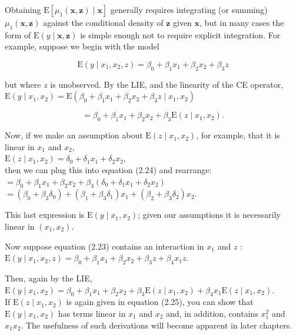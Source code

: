 \documentclass[10pt]{article}
\begin{document}
Obtaining $\mathrm{E}\left[\mu_{1}(\mathbf{x}, \mathbf{z}) \mid \mathbf{x}\right]$ generally requires integrating (or summing) $\mu_{1}(\mathbf{x}, \mathbf{z})$ against the conditional density of $\mathbf{z}$ given $\mathbf{x}$, but in many cases the form of $\mathrm{E}(y \mid \mathbf{x}, \mathbf{z})$ is simple enough not to require explicit integration. For example, suppose we begin with the model


\begin{equation*}
\mathrm{E}\left(y \mid x_{1}, x_{2}, z\right)=\beta_{0}+\beta_{1} x_{1}+\beta_{2} x_{2}+\beta_{3} z \tag{2.23}
\end{equation*}


but where $z$ is unobserved. By the LIE, and the linearity of the CE operator,\\
$\mathrm{E}\left(y \mid x_{1}, x_{2}\right)=\mathrm{E}\left(\beta_{0}+\beta_{1} x_{1}+\beta_{2} x_{2}+\beta_{3} z \mid x_{1}, x_{2}\right)$


\begin{equation*}
=\beta_{0}+\beta_{1} x_{1}+\beta_{2} x_{2}+\beta_{3} \mathrm{E}\left(z \mid x_{1}, x_{2}\right) . \tag{2.24}
\end{equation*}


Now, if we make an assumption about $\mathrm{E}\left(z \mid x_{1}, x_{2}\right)$, for example, that it is linear in $x_{1}$ and $x_{2}$,\\
$\mathrm{E}\left(z \mid x_{1}, x_{2}\right)=\delta_{0}+\delta_{1} x_{1}+\delta_{2} x_{2}$,\\
then we can plug this into equation (2.24) and rearrange:\\
$=\beta_{0}+\beta_{1} x_{1}+\beta_{2} x_{2}+\beta_{3}\left(\delta_{0}+\delta_{1} x_{1}+\delta_{2} x_{2}\right)$\\
$=\left(\beta_{0}+\beta_{3} \delta_{0}\right)+\left(\beta_{1}+\beta_{3} \delta_{1}\right) x_{1}+\left(\beta_{2}+\beta_{3} \delta_{2}\right) x_{2}$.

This last expression is $\mathrm{E}\left(y \mid x_{1}, x_{2}\right)$; given our assumptions it is necessarily linear in $\left(x_{1}, x_{2}\right)$.

Now suppose equation (2.23) contains an interaction in $x_{1}$ and $z$ :\\
$\mathrm{E}\left(y \mid x_{1}, x_{2}, z\right)=\beta_{0}+\beta_{1} x_{1}+\beta_{2} x_{2}+\beta_{3} z+\beta_{4} x_{1} z$.

Then, again by the LIE,\\
$\mathrm{E}\left(y \mid x_{1}, x_{2}\right)=\beta_{0}+\beta_{1} x_{1}+\beta_{2} x_{2}+\beta_{3} \mathrm{E}\left(z \mid x_{1}, x_{2}\right)+\beta_{4} x_{1} \mathrm{E}\left(z \mid x_{1}, x_{2}\right)$.\\
If $\mathrm{E}\left(z \mid x_{1}, x_{2}\right)$ is again given in equation (2.25), you can show that $\mathrm{E}\left(y \mid x_{1}, x_{2}\right)$ has terms linear in $x_{1}$ and $x_{2}$ and, in addition, contains $x_{1}^{2}$ and $x_{1} x_{2}$. The usefulness of such derivations will become apparent in later chapters.
\end{document}
